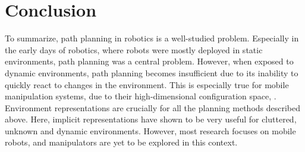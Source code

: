 

\section{Conclusion}
\label{sec:state_conclusion}

To summarize, path planning in robotics is a well-studied
problem. Especially in the early days of robotics, where
robots were mostly deployed in static environments, path
planning was a central problem. However, when exposed to
dynamic environments, path planning becomes insufficient due
to its inability to quickly react to changes in the
environment. This is especially true for mobile manipulation
systems, due to their high-dimensional configuration space,
\cite{Avanzini2018}. Environment representations are
crucially for all the planning methods described above.
Here, implicit representations have shown to be very useful
for cluttered, unknown and dynamic environments. However,
most research focuses on mobile robots, and manipulators
are yet to be explored in this context.


